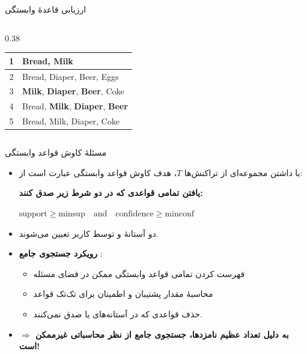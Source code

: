 \begin{frame}{ارزیابی قاعدهٔ وابستگی}{}
\begin{columns}[T,onlytextwidth]
\begin{column}{0.38\textwidth}
\begin{latin}
\begin{tabular}{|c|l|}
1 & Bread, Milk \\ \hline
2 & Bread, Diaper, Beer, Eggs \\ \hline
3 & \textbf{\color{red}Milk}, \textbf{\color{red}Diaper}, \textbf{\color{blue}Beer}, Coke \\ \hline
4 & Bread, \textbf{\color{red}Milk}, \textbf{\color{red}Diaper}, \textbf{\color{blue}Beer} \\ \hline
5 & Bread, Milk, Diaper, Coke \\ \hline
\end{tabular}
\end{latin}
\end{column}
\end{columns}
\end{frame}

\begin{frame}{مسئلهٔ کاوش قواعد وابستگی}{}
\begin{itemize}\setlength{\itemsep}{5pt}
    \item با داشتن مجموعه‌ای از تراکنش‌ها $T$، هدف کاوش قواعد وابستگی عبارت است از:
    \begin{center}
    \textbf{\large یافتن تمامی قواعدی که در دو شرط زیر صدق کنند:}
    \end{center}
    \begin{center}
    \begin{latin}
    $\text{support} \ge \text{minsup} \quad \text{and} \quad \text{confidence} \ge \text{minconf}$
    \end{latin}
    \end{center}
    \item دو آستانهٔ  و  توسط کاربر تعیین می‌شوند.
    \item \textbf{رویکرد جستجوی جامع} :
    \begin{itemize}\setlength{\itemsep}{2pt}
        \item فهرست کردن تمامی قواعد وابستگی ممکن در فضای مسئله
        \item محاسبهٔ مقدار پشتیبان و اطمینان برای تک‌تک قواعد
        \item حذف قواعدی که در آستانه‌های  یا  صدق نمی‌کنند.
    \end{itemize}
    \item \alert{\textbf{$\Rightarrow$ به دلیل تعداد عظیم نامزدها، جستجوی جامع از نظر محاسباتی غیرممکن است!}}
\end{itemize}
\end{frame}

